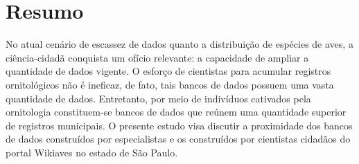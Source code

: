 \section{Resumo}

No atual cenário de escassez de dados quanto a distribuição de espécies de aves, a ciência-cidadã conquista um ofício relevante: a capacidade de ampliar a quantidade de dados vigente. O esforço de cientistas para acumular registros ornitológicos não é ineficaz, de fato, tais bancos de dados possuem uma vasta quantidade de dados. Entretanto, por meio de indivíduos cativados pela ornitologia constituem-se bancos de dados que reúnem uma quantidade superior de registros municipais. O presente estudo visa discutir a proximidade dos bancos de dados construídos por especialistas e os construídos por cientistas cidadãos do portal Wikiaves no estado de São Paulo.  